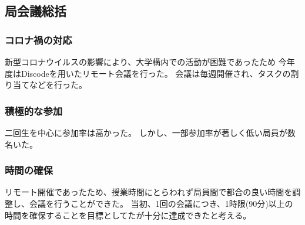 \subsection*{局会議総括}

\subsubsection*{コロナ禍の対応}

新型コロナウイルスの影響により、大学構内での活動が困難であったため
今年度はDiscodeを用いたリモート会議を行った。
会議は毎週開催され、タスクの割り当てなどを行った。

\subsubsection*{積極的な参加}

二回生を中心に参加率は高かった。
しかし、一部参加率が著しく低い局員が数名いた。

\subsubsection*{時間の確保}

リモート開催であったため、授業時間にとらわれず局員間で都合の良い時間を調整し、会議を行うことができた。
当初、1回の会議につき、1時限(90分)以上の時間を確保することを目標としてたが十分に達成できたと考える。

